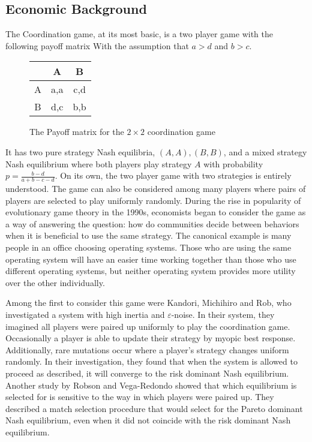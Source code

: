\documentclass[]{article}
\begin{document}
	\subsection{Economic Background}\label{economicbackground}
		The Coordination game, at its most basic, is a two player game with the following payoff matrix
		With the assumption that $a>d$ and $b>c$.
		\begin{figure}[h!]\label{twobytwopayoff}
		\begin{center} 
			\begin{tabular}{c|cc}
				&A&B\\
				\hline 
				A&a,a&c,d\\
				B&d,c&b,b
			\end{tabular}
		\end{center}
		\caption{The Payoff matrix for the $2\times 2$ coordination game}
		\end{figure}
		It has two pure strategy Nash equilibria, $(A,A), (B,B)$, and a mixed strategy Nash equilibrium where both players play strategy $A$ with probability $p=\frac{b-d}{a+b-c-d}$. On its own, the two player game with two strategies is entirely understood\cite{Maschler2013}. 
		The game can also be considered among many players where pairs of players are selected to play uniformly randomly. During the rise in popularity of evolutionary game theory in the 1990s, economists began to consider the game as a way of answering the question: how do communities decide between behaviors when it is beneficial to use the same strategy. The canonical example is many people in an office choosing operating systems. Those who are using the same operating system will have an easier time working together than those who use different operating systems, but neither operating system provides more utility over the other individually. 
		
		Among the first to consider this game were Kandori, Michihiro and Rob, who investigated a system with high inertia and $\varepsilon$-noise. In their system, they imagined all players were paired up uniformly to play the coordination game. Occasionally a player is able to update their strategy by myopic best response. Additionally, rare mutations occur where a player's strategy changes uniform randomly. In their investigation, they found that when the system is allowed to proceed as described, it will converge to the risk dominant Nash equilibrium\cite{Kandori1993}. Another study by Robson and Vega-Redondo showed that which equilibrium is selected for is sensitive to the way in which players were paired up. They described a match selection procedure that would select for the Pareto dominant Nash equilibrium, even when it did not coincide with the risk dominant Nash equilibrium\cite{Robson1995}. 
		
\end{document}
